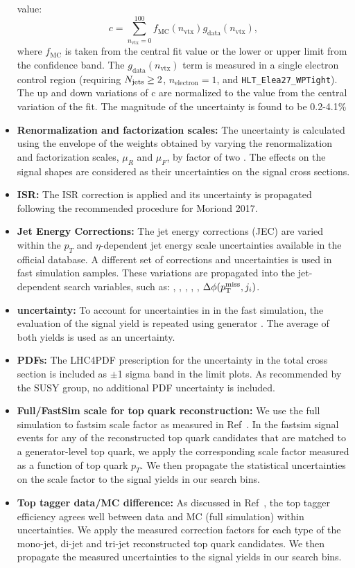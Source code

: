 \begin{itemize}
value:
\begin{equation}
c = \sum_{n_{\text{vtx}}=0}^{100} f_{\text{MC}}(n_{\text{vtx}})g_{\text{data}}(n_{\text{vtx}}) \label{eq:puacc-expval},
\end{equation}
where $f_{\text{MC}}$ is taken from the central fit value or the lower or upper limit from the confidence band.
The $g_{\text{data}}(n_{\text{vtx}})$ term is measured in a single electron control region (requiring $N_{\text{jets}}\geq2$, $n_{\text{electron}}=1$, and \texttt{HLT\_Elea27\_WPTight}).
The up and down variations of c are normalized to the value from the central variation of the fit. The magnitude of the uncertainty is found to be 0.2-4.1\%
\item {\bf Renormalization and factorization scales:} The uncertainty is calculated using the envelope of the weights obtained by varying the renormalization and factorization scales, $\mu_{R}$ and $\mu_{F}$, by factor of two \cite{Cacciari:2003fi,Catani:2003zt}. The effects on the signal shapes are considered as their uncertainties on the signal cross sections. %
\item {\bf ISR:} The ISR correction is applied and its uncertainty is propagated following the recommended procedure for Moriond 2017.
\item {\bf Jet Energy Corrections:} The jet energy corrections (JEC) are varied within the $p_{T}$ and $\eta$-dependent jet energy scale uncertainties available in the official database. A different set of corrections and uncertainties is used in fast simulation samples. These variations are propagated into the jet-dependent search variables, such as: \nbjets, \ntops, \MET, \MTTwo, \HT, $\Delta\phi(p^{\rm miss}_{\rm T},j_{i})$.
\item {\bf \MET uncertainty:} To account for uncertainties in \MET in the fast simulation, the evaluation of the signal yield is repeated using generator \MET. The average of both yields is used as an uncertainty.
\item {\bf PDFs:} The LHC4PDF\cite{Butterworth:2015oua} prescription for the uncertainty in the total cross section is included as $\pm$1 sigma band in the limit plots. As recommended by the SUSY group, no additional PDF uncertainty is included.
\item {\bf Full/FastSim scale for top quark reconstruction:} We use the full simulation to fastsim scale factor as measured in Ref~\cite{AN-16-461}. In the fastsim signal events for any of the reconstructed top quark candidates that are matched to a generator-level top quark, we apply the corresponding scale factor measured as a function of top quark $p_{T}$. We then propagate the statistical uncertainties on the scale factor to the signal yields in our search bins.
\item {\bf Top tagger data/MC difference:} As discussed in Ref~\cite{AN-16-461}, the top tagger efficiency agrees well between data and MC (full simulation) within uncertainties. We apply the measured correction factors for each type of the mono-jet, di-jet and tri-jet reconstructed top quark candidates. We then propagate the measured uncertainties to the signal yields in our search bins.
\end{itemize}

